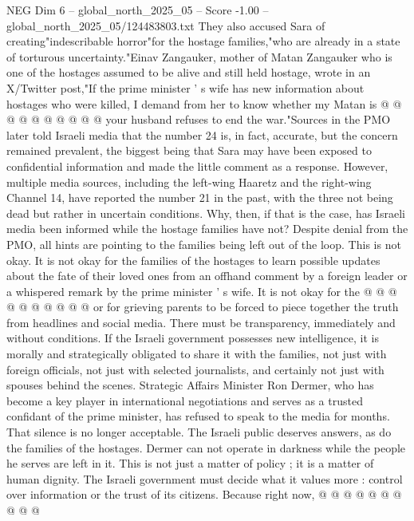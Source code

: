 \begin{textsample}{NEG Dim 6 – global\_north\_2025\_05 – Score -1.00 – global\_north\_2025\_05/124483803.txt}
They also accused Sara of creating"indescribable horror"for the hostage families,"who are already in a state of torturous uncertainty."Einav Zangauker, mother of Matan Zangauker who is one of the hostages assumed to be alive and still held hostage, wrote in an X/Twitter post,"If the prime minister ' s wife has new information about hostages who were killed, I demand from her to know whether my Matan is @ @ @ @ @ @ @ @ @ @ your husband refuses to end the war."Sources in the PMO later told Israeli media that the number 24 is, in fact, accurate, but the concern remained prevalent, the biggest being that Sara may have been exposed to confidential information and made the little comment as a response.
However, multiple media sources, including the left-wing Haaretz and the right-wing Channel 14, have reported the number 21 in the past, with the three not being dead but rather in uncertain conditions.
Why, then, if that is the case, has Israeli media been informed while the hostage families have not?
Despite denial from the PMO, all hints are pointing to the families being left out of the loop.
This is not okay.
It is not okay for the families of the hostages to learn possible updates about the fate of their loved ones from an offhand comment by a foreign leader or a whispered remark by the prime minister ' s wife.
It is not okay for the @ @ @ @ @ @ @ @ @ @ or for grieving parents to be forced to piece together the truth from headlines and social media.
There must be transparency, immediately and without conditions.
If the Israeli government possesses new intelligence, it is morally and strategically obligated to share it with the families, not just with foreign officials, not just with selected journalists, and certainly not just with spouses behind the scenes.
Strategic Affairs Minister Ron Dermer, who has become a key player in international negotiations and serves as a trusted confidant of the prime minister, has refused to speak to the media for months.
That silence is no longer acceptable.
The Israeli public deserves answers, as do the families of the hostages.
Dermer can not operate in darkness while the people he serves are left in it.
This is not just a matter of policy ; it is a matter of human dignity.
The Israeli government must decide what it values more : control over information or the trust of its citizens.
Because right now, @ @ @ @ @ @ @ @ @ @

\end{textsample}
